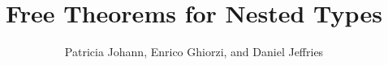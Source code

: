 \documentclass[acmsmall,review,anonymous]{acmart}
\title[Free Theorems for Nested Types]{Free Theorems for
  Nested Types} %
\author{Patricia Johann, Enrico Ghiorzi, and Daniel Jeffries}
\affiliation{
  \institution{Appalachian State University}            %
}
\theoremstyle{definition}
\begin{document}

\begin{comment}

    \[\begin{array}{l}
      \mathtt{data\; Eql \;(A : Set)\;(B : Set)\;:\;Set\;where}\\
    \hspace*{0.4in}\mathtt{refl\;:\; \;Eql \;A\;A}
    \end{array}\]

    \[\begin{array}{l}
    \mathtt{data\; Z \;:\;Set\;where}\\
    \hspace*{0.4in}\mathtt{szero\;:\; \;Z}
    \end{array}\]

    \[\begin{array}{l}
      \mathtt{data\; S \;(A : Set)\;:\;Set\;where}\\
    \hspace*{0.4in}\mathtt{ssucc\;:\; A \rightarrow S\;A}
    \end{array}\]

    \[\begin{array}{l}
    \mathtt{data\; GNat\;(A : Set)\;:\;Set\;where}\\
    \hspace*{0.4in}\mathtt{gzero\;:\; GNat\;Z}\\
      \hspace*{0.4in}\mathtt{gsucc\;:\;GNat\;A \rightarrow GNat\;(S\;A)}
    \end{array}\]


    \[\begin{array}{l}
      \mathtt{data\; GVec\;(A : Set)\;(N : Set)\;:\;Set\;where}\\
      \hspace*{0.4in}\mathtt{gnil\;:\; GVec\;A\;(GNat\;Z)}\\
      \hspace*{0.4in}\mathtt{gcons\;:\; A \rightarrow 
          GVec\;A\;(GNat\;N) \rightarrow GVec\;A\;(GNat\;(S\;N))} 
    \end{array}\]

    \[\begin{array}{l}
      \mathtt{data\; PTree\;(A : Set)\;:\;Set\;where}\\
      \hspace*{0.4in}\mathtt{pleaf\;:\; A \rightarrow PTree\;A}\\
      \hspace*{0.4in}\mathtt{pnode\;:\; PTree\;(A \times A) \rightarrow PTree\;A} \\
    \end{array}\]



\end{comment}
\end{document}
